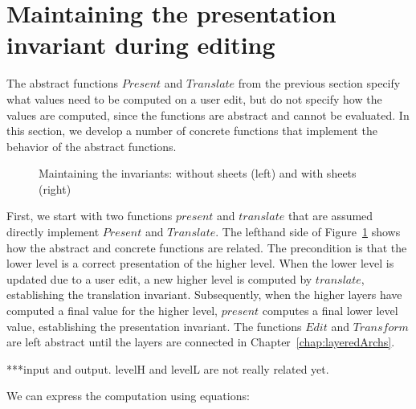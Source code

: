 %																
%																
%																
\section{Maintaining the presentation invariant during editing}

The abstract functions $Present$ and $Translate$ from the previous section specify what values need to be computed on a user edit, but do not specify how the values are computed, since the functions are abstract and cannot be evaluated. In this section, we develop a number of concrete  functions that implement the behavior of the abstract functions.

\begin{figure}
\begin{center}
\begin{center}
 
\end{center}
\caption{Maintaining the invariants: without sheets (left) and with sheets (right)}\label{maintainingInvs} 
\end{center}
\end{figure}

First, we start with two functions $present$ and $translate$ that are assumed directly implement $Present$ and $Translate$. The lefthand side of Figure~\ref{maintainingInvs} shows how the abstract and concrete functions are related. The precondition is that the lower level is a correct presentation of the higher level. When the lower level is updated due to a user edit, a new higher level is computed by $translate$, establishing the translation invariant. Subsequently, when the higher layers have computed a final value for the higher level, $present$ computes a final lower level value, establishing the presentation invariant. The functions $Edit$ and $Transform$ are left abstract until the layers are connected in Chapter~\ref{chap:layeredArchs}.

***input and output. levelH and levelL are not really related yet.

We can express the computation using equations:


